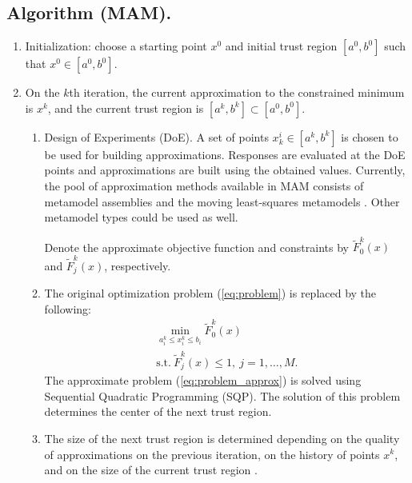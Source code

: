 \documentclass[runningheads,a4paper]{llncs}
\begin{document}
\subsection*{Algorithm (MAM).}
\begin{enumerate}
\item Initialization: choose a starting point $ x^0$ and initial trust
    region $[ a^0,  b^0]$ such that $ x^0 \in [ a^0,  b^0]$.

\item On the $k$th iteration, the current approximation to the constrained
    minimum is $ x^k$, and the current trust region is $[ a^k,  b^k]
    \subset [ a^0,  b^0]$.
  \begin{enumerate}[label=(\alph*)]
    \item Design of Experiments (DoE). A set of points $ x_k^i \in [
        a^k,  b^k]$ is chosen to be used for building approximations.
        Responses are evaluated at the DoE points and approximations
        are built using the obtained values. Currently, the pool of
        approximation methods available in MAM consists of metamodel
        assemblies \cite{PolynkinToropov2012} and the moving
        least-squares metamodels
        \cite{LancasterSalkauskas1981,Liszka1984,ChoiYounYang2001,ToropovSchrammSahaiJones2005}.
        Other metamodel types could be used as well.

    Denote the approximate objective function and constraints by $\widetilde{F}^k_0(x)$ and $\widetilde{F}^k_j(x)$, respectively.

    \item The original optimization problem (\ref{eq:problem}) is
        replaced by the following:
    \begin{equation}
      \label{eq:problem_approx}
      \begin{array}{c}
      \min\limits_{a_i^k \le x_i ^k\le b_i}\widetilde{F}^k_0(x) \\
      \text{s.t.}\ \widetilde{F}^k_j( x) \le 1,\ j=1,\dots ,M.
      \end{array}
    \end{equation}
    The approximate problem (\ref{eq:problem_approx}) is solved using
    Sequential Quadratic Programming (SQP). The solution of this
    problem determines the center of the next trust region.

    \item The size of the next trust region is determined depending on
        the quality of approximations on the previous iteration, on the
        history of points $ x^k$, and on the size of the current trust
        region \cite{KeulenToropovMarkine1996}.


\end{enumerate}
\end{enumerate}
\end{document}
